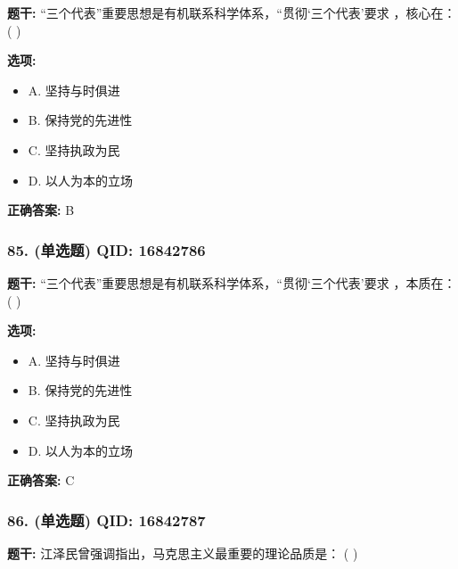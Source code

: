 \documentclass[12pt,UTF8]{ctexart}
\begin{document}
\textbf{题干:}
“三个代表”重要思想是有机联系科学体系，“贯彻‘三个代表’要求 ，核心在： ( )

\textbf{选项:}
\begin{itemize}[leftmargin=*]

  \item A. 坚持与时俱进

  \item B. 保持党的先进性

  \item C. 坚持执政为民

  \item D. 以人为本的立场

\end{itemize}

\textbf{正确答案:}
B

\vspace{0.3em}\hrulefill\vspace{0.7em}

\subsubsection*{85. (单选题) \small QID: 16842786}

\textbf{题干:}
“三个代表”重要思想是有机联系科学体系，“贯彻‘三个代表’要求 ，本质在： ( )

\textbf{选项:}
\begin{itemize}[leftmargin=*]

  \item A. 坚持与时俱进

  \item B. 保持党的先进性

  \item C. 坚持执政为民

  \item D. 以人为本的立场

\end{itemize}

\textbf{正确答案:}
C

\vspace{0.3em}\hrulefill\vspace{0.7em}

\subsubsection*{86. (单选题) \small QID: 16842787}

\textbf{题干:}
江泽民曾强调指出，马克思主义最重要的理论品质是： ( )
\end{document}

